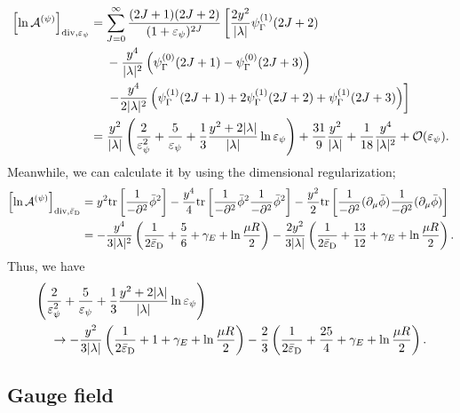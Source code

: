 \documentclass[12pt]{article}
\begin{document}
\begin{align}
 \left[\ln\mathcal A^{(\psi)}\right]_{{\rm div},\varepsilon_{\psi}}
  & = \sum_{J=0}^{\infty}
 \frac{(2J+1)(2J+2)}{(1+\varepsilon_{\psi})^{2J}}
 \left[
  \frac{2y^2}{|\lambda|}\psi_{\Gamma}^{(1)}(2J+2)\right.\nonumber \\
  & \hspace{3ex}-\frac{y^4}{|\lambda|^2}
  \left(
   \psi_{\Gamma}^{(0)}(2J+1)-\psi_{\Gamma}^{(0)}(2J+3)
  \right)\nonumber                                                \\
  & \hspace{3ex}\left.-\frac{y^4}{2|\lambda|^2}
  \left(
   \psi_{\Gamma}^{(1)}(2J+1)+2\psi_{\Gamma}^{(1)}(2J+2)+\psi_{\Gamma}^{(1)}(2J+3)
  \right)
 \right]\nonumber                                                 \\
  & = \frac{y^2}{|\lambda|}
 \left(
  \frac{2}{\varepsilon_{\psi}^2}+\frac{5}{\varepsilon_{\psi}}+\frac{1}{3}\frac{y^2+2|\lambda|}{|\lambda|}\ln\varepsilon_{\psi}
 \right)+\frac{31}{9}\frac{y^2}{|\lambda|}+\frac{1}{18}\frac{y^4}{|\lambda|^2}+\mathcal O(\varepsilon_{\psi}).
\end{align}
Meanwhile, we can calculate it by using the dimensional regularization;
\begin{align}
 \left[\ln\mathcal A^{(\psi)}\right]_{{\rm div},\bar{\varepsilon}_{\rm D}}
  & = y^2{\rm tr}
 \left[
  \frac{1}{-\partial^2}\bar\phi^2
 \right]-\frac{y^4}{4}{\rm tr}
 \left[
  \frac{1}{-\partial^2}\bar\phi^2\frac{1}{-\partial^2}\bar\phi^2
 \right]-\frac{y^2}{2}{\rm tr}
 \left[
  \frac{1}{-\partial^2}(\partial_\mu\bar\phi)\frac{1}{-\partial^2}(\partial_\mu\bar\phi)
 \right]\nonumber               \\
  & = -\frac{y^4}{3|\lambda|^2}
 \left(
  \frac{1}{2\bar{\varepsilon}_{\rm D}}+\frac{5}{6}+\gamma_E+\ln\frac{\mu R}{2}
 \right)-\frac{2y^2}{3|\lambda|}
 \left(
  \frac{1}{2\bar{\varepsilon}_{\rm D}}+\frac{13}{12}+\gamma_E+\ln\frac{\mu R}{2}
 \right).
\end{align}
Thus, we have
\begin{align}
  &
 \left(
  \frac{2}{\varepsilon_{\psi}^2}+\frac{5}{\varepsilon_{\psi}}+\frac{1}{3}\frac{y^2+2|\lambda|}{|\lambda|}\ln\varepsilon_{\psi}
 \right)\nonumber                            \\
  & \hspace{3ex} \to -\frac{y^2}{3|\lambda|}
 \left(
  \frac{1}{2\bar{\varepsilon}_{\rm D}}+1+\gamma_E+\ln\frac{\mu R}{2}
 \right)-\frac{2}{3}
 \left(
  \frac{1}{2\bar{\varepsilon}_{\rm D}}+\frac{25}{4}+\gamma_E+\ln\frac{\mu R}{2}
 \right).
\end{align}

\subsection{Gauge field}
\end{document}
